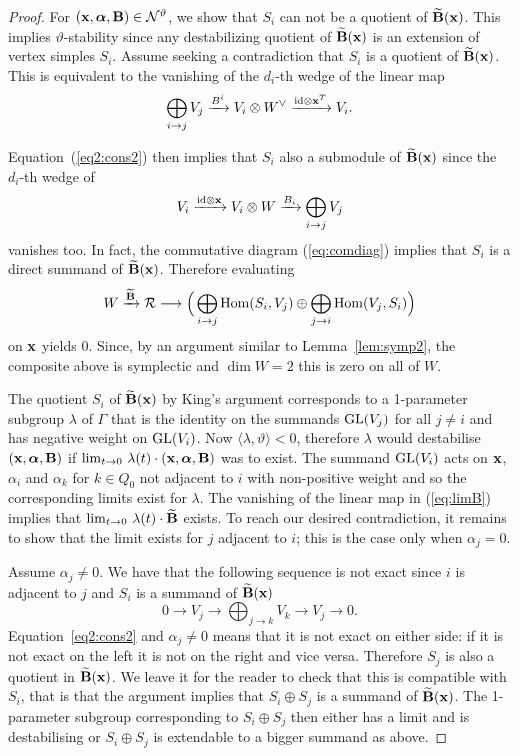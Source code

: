 \documentclass{amsart}
\newcommand{\balpha}{\boldsymbol{\alpha}}
\theoremstyle{definition}
\begin{document}
\begin{proof}
For $(\bfx, \balpha, \bfB) \in \cN^\vartheta$, we show that $S_i$ can not be a quotient of $\widetilde{\mathbf{B}}(\mathbf{x})$. This implies $\vartheta$-stability since any destabilizing quotient of $\widetilde{\mathbf{B}}(\mathbf{x})$ is an extension of vertex simples $S_i$.
Assume seeking a contradiction that $S_i$ is a quotient of $\widetilde{\mathbf{B}}(\mathbf{x})$.
This is equivalent to the vanishing of the $d_i$-th wedge of the linear map
$$\bigoplus_{i \rightarrow j} V_j \xrightarrow{B^i} V_i \otimes W^\vee \xrightarrow{\text{id} \otimes \mathbf{x}^T} V_i.$$

Equation~(\ref{eq2:cons2}) then implies that $S_i$ also a submodule of $\widetilde{\mathbf{B}}(\mathbf{x})$ since the $d_i$-th wedge of 
$$V_i \xrightarrow{\text{id} \otimes \mathbf{x}} V_i \otimes W \xrightarrow{B_i} \bigoplus_{i \rightarrow j} V_j$$
vanishes too.
In fact, the commutative diagram (\ref{eq:comdiag}) implies that $S_i$ is a direct summand of $\widetilde{\mathbf{B}}(\mathbf{x})$.
Therefore evaluating 
\begin{equation}\label{eq:limB}
W \xrightarrow{\widetilde{\mathbf{B}}} \mathcal{R} \longrightarrow \Big(\bigoplus_{i \rightarrow j} \operatorname{Hom}(S_i,V_j) \oplus \bigoplus_{j \rightarrow i} \operatorname{Hom}(V_j, S_i)\Big)
\end{equation}
on $\mathbf{x}$ yields 0.
Since, by an argument similar to Lemma~\ref{lem:symp2}, the composite above is symplectic and $\dim W=2$ this is zero on all of $W$.

The quotient $S_i$ of $\widetilde{\mathbf{B}}(\mathbf{x})$ by King's argument corresponds to a 1-parameter subgroup $\lambda$ of $\Gamma$ that is the identity on the summands $\operatorname{GL}(V_j)$ for all $j\neq i$ and has negative weight on $\operatorname{GL}(V_i)$. 
Now $\langle \lambda, \vartheta\rangle <0$, therefore $\lambda$ would destabilise $(\bfx, \balpha, \bfB)$ if $\lim_{t \rightarrow 0} \, \lambda(t)\cdot (\bfx, \balpha, \bfB)$ was to exist.
The summand $\operatorname{GL}(V_i)$ acts on $\mathbf{x}$, $\alpha_i$ and $\alpha_k$ for $k \in Q_0$ not adjacent to $i$ with non-positive weight and so the corresponding limits exist for $\lambda$.
The vanishing of the linear map in (\ref{eq:limB}) implies that $\lim_{t \rightarrow 0}\, \lambda(t)\cdot \widetilde{\mathbf{B}}$ exists.
To reach our desired contradiction, it remains to show that the limit exists for $j$ adjacent to $i$; this is the case only when $\alpha_j=0$.

Assume $\alpha_j \neq 0$.
We have that the following sequence is not exact since $i$ is adjacent to $j$ and $S_i$ is a summand of $\widetilde{\mathbf{B}}(\mathbf{x})$
$$0 \longrightarrow V_j \longrightarrow \bigoplus_{j \rightarrow k} V_k \longrightarrow V_j \longrightarrow 0.$$
Equation~\eqref{eq2:cons2} and $\alpha_j \neq 0$ means that it is not exact on either side: if it is not exact on the left it is not on the right and vice versa.
Therefore $S_j$ is also a quotient in $\widetilde{\mathbf{B}}(\mathbf{x})$.
We leave it for the reader to check that this is compatible with $S_i$, that is that the argument implies that $S_i \oplus S_j$ is a summand of $\widetilde{\mathbf{B}}(\mathbf{x})$.
The 1-parameter subgroup corresponding to $S_i \oplus S_j$ then either has a limit and is destabilising or $S_i \oplus S_j$ is extendable to a bigger summand as above.
\end{proof}
\end{document}
